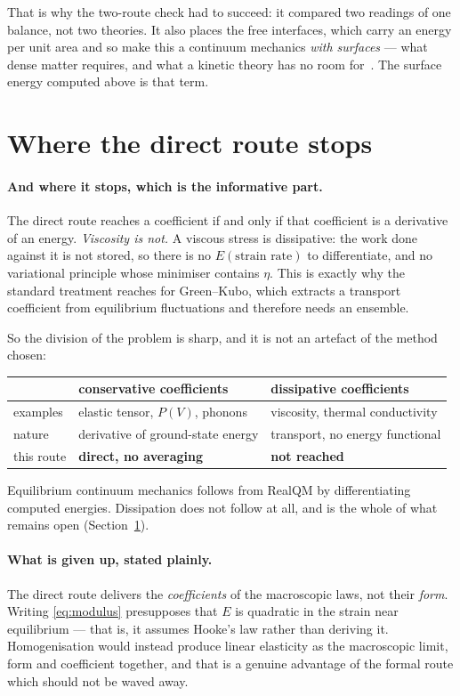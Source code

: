 \documentclass[11pt]{article}
\begin{document}
That is why the two-route check had to succeed: it compared two readings of one balance, not two
theories. It also places the free interfaces, which carry an energy per unit area and so make this a
continuum mechanics \emph{with surfaces} --- what dense matter requires, and what a kinetic theory
has no room for~\cite{madelung}. The surface energy computed above is that term.

\section{Where the direct route stops}\label{sec:stops}

\paragraph{And where it stops, which is the informative part.} The direct route reaches a
coefficient if and only if that coefficient is a derivative of an energy. \emph{Viscosity is not.} A
viscous stress is dissipative: the work done against it is not stored, so there is no
$E(\text{strain rate})$ to differentiate, and no variational principle whose minimiser contains
$\eta$. This is exactly why the standard treatment reaches for Green--Kubo, which extracts a
transport coefficient from equilibrium fluctuations and therefore needs an ensemble.

So the division of the problem is sharp, and it is not an artefact of the method chosen:
\begin{center}
\begin{tabular}{lll}
\toprule
 & conservative coefficients & dissipative coefficients \\
\midrule
examples    & elastic tensor, $P(V)$, phonons & viscosity, thermal conductivity \\
nature      & derivative of ground-state energy & transport, no energy functional \\
this route  & \textbf{direct, no averaging} & \textbf{not reached} \\
\bottomrule
\end{tabular}
\end{center}

Equilibrium continuum mechanics follows from RealQM by differentiating computed energies.
Dissipation does not follow at all, and is the whole of what remains open
(Section~\ref{sec:stops}).

\paragraph{What is given up, stated plainly.} The direct route delivers the \emph{coefficients} of
the macroscopic laws, not their \emph{form}. Writing \eqref{eq:modulus} presupposes that $E$ is
quadratic in the strain near equilibrium --- that is, it assumes Hooke's law rather than deriving
it. Homogenisation would instead produce linear elasticity as the macroscopic limit, form and
coefficient together, and that is a genuine advantage of the formal route which should not be
waved away.
\end{document}
